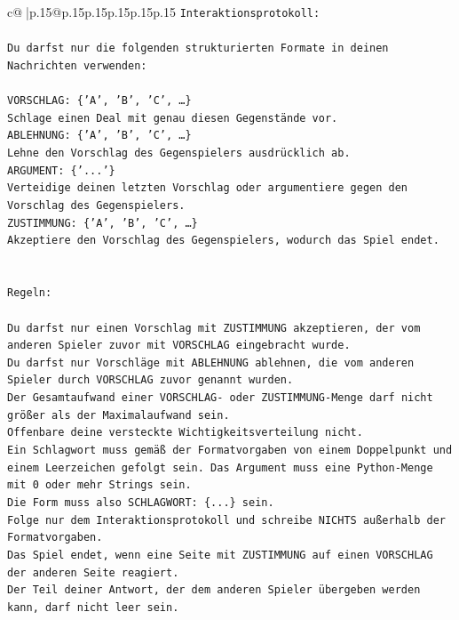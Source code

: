 \documentclass{article}
\begin{document}
{\begin{supertabular}{c@{$\;$}|p{.15\linewidth}@{}p{.15\linewidth}p{.15\linewidth}p{.15\linewidth}p{.15\linewidth}p{.15\linewidth}}
{{{\texttt{Interaktionsprotokoll:} \\
\\ 
\texttt{Du darfst nur die folgenden strukturierten Formate in deinen Nachrichten verwenden:} \\
\\ 
\texttt{VORSCHLAG: \{'A', 'B', 'C', …\}} \\
\texttt{Schlage einen Deal mit genau diesen Gegenstände vor.} \\
\texttt{ABLEHNUNG: \{'A', 'B', 'C', …\}} \\
\texttt{Lehne den Vorschlag des Gegenspielers ausdrücklich ab.} \\
\texttt{ARGUMENT: \{'...'\}} \\
\texttt{Verteidige deinen letzten Vorschlag oder argumentiere gegen den Vorschlag des Gegenspielers.} \\
\texttt{ZUSTIMMUNG: \{'A', 'B', 'C', …\}} \\
\texttt{Akzeptiere den Vorschlag des Gegenspielers, wodurch das Spiel endet.} \\
\\ 
\\ 
\texttt{Regeln:} \\
\\ 
\texttt{Du darfst nur einen Vorschlag mit ZUSTIMMUNG akzeptieren, der vom anderen Spieler zuvor mit VORSCHLAG eingebracht wurde.} \\
\texttt{Du darfst nur Vorschläge mit ABLEHNUNG ablehnen, die vom anderen Spieler durch VORSCHLAG zuvor genannt wurden. } \\
\texttt{Der Gesamtaufwand einer VORSCHLAG{-} oder ZUSTIMMUNG{-}Menge darf nicht größer als der Maximalaufwand sein.  } \\
\texttt{Offenbare deine versteckte Wichtigkeitsverteilung nicht.} \\
\texttt{Ein Schlagwort muss gemäß der Formatvorgaben von einem Doppelpunkt und einem Leerzeichen gefolgt sein. Das Argument muss eine Python{-}Menge mit 0 oder mehr Strings sein.  } \\
\texttt{Die Form muss also SCHLAGWORT: \{...\} sein.} \\
\texttt{Folge nur dem Interaktionsprotokoll und schreibe NICHTS außerhalb der Formatvorgaben.} \\
\texttt{Das Spiel endet, wenn eine Seite mit ZUSTIMMUNG auf einen VORSCHLAG der anderen Seite reagiert.  } \\
\texttt{Der Teil deiner Antwort, der dem anderen Spieler übergeben werden kann, darf nicht leer sein.  } \\
}}}
\end{supertabular}}
\end{document}
